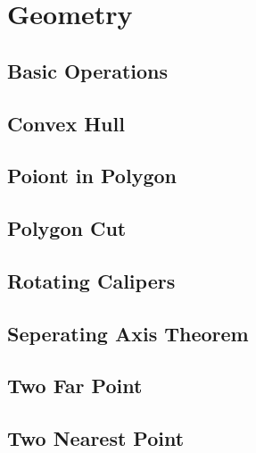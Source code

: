 \documentclass[10pt,landscape,a4paper,twocolumn]{article}
\begin{document}
\section{Geometry}
\subsection{Basic Operations}


\subsection{Convex Hull}


\subsection{Poiont in Polygon}


\subsection{Polygon Cut}


\subsection{Rotating Calipers}


\subsection{Seperating Axis Theorem}



% 

\subsection{Two Far Point}


\subsection{Two Nearest Point}

\end{document}
